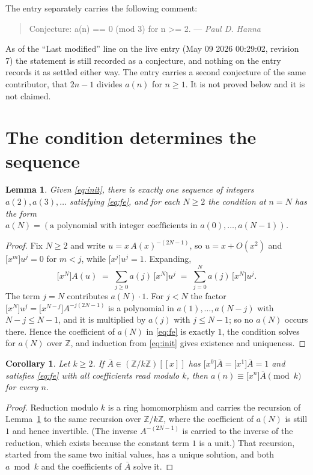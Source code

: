 \documentclass[11pt,a4paper]{article}
\theoremstyle{plain}
\newtheorem{lemma}[theorem]{Lemma}
\newtheorem{corollary}[theorem]{Corollary}
\theoremstyle{definition}
\begin{document}
The entry separately carries the following comment:
\begin{quote}\small
Conjecture: a(n) == 0 (mod 3) for n >= 2. --- \emph{Paul D. Hanna}
\end{quote}
As of the ``Last modified'' line on the live entry (May 09 2026 00:29:02, revision 7) the statement is
still recorded as a conjecture, and nothing on the entry records it as settled either way.
The entry carries a second conjecture of the same contributor, that $2n-1$ divides $a(n)$
for $n\ge1$. It is not proved below and it is not claimed.

\section{The condition determines the sequence}

\begin{lemma}\label{lem:unique}
Given \eqref{eq:init}, there is exactly one sequence of integers $a(2),a(3),\dots$
satisfying \eqref{eq:fe}, and for each $N\ge2$ the condition at $n=N$ has the form
$a(N)=(\text{a polynomial with integer coefficients in }a(0),\dots,a(N-1))$.
\end{lemma}

\begin{proof}
Fix $N\ge2$ and write $u=x\,A(x)^{-(2N-1)}$, so $u=x+O(x^{2})$ and
$\bigl[x^{m}\bigr]u^{j}=0$ for $m<j$, while $\bigl[x^{j}\bigr]u^{j}=1$. Expanding,
\[
\bigl[x^{N}\bigr]A(u)\;=\;\sum_{j\ge0}a(j)\,\bigl[x^{N}\bigr]u^{j}
\;=\;\sum_{j=0}^{N}a(j)\,\bigl[x^{N}\bigr]u^{j} .
\]
The term $j=N$ contributes $a(N)\cdot1$. For $j<N$ the factor
$\bigl[x^{N}\bigr]u^{j}=\bigl[x^{N-j}\bigr]A^{-j(2N-1)}$ is a polynomial in
$a(1),\dots,a(N-j)$ with $N-j\le N-1$, and it is multiplied by $a(j)$ with $j\le N-1$; so
no $a(N)$ occurs there. Hence the coefficient of $a(N)$ in \eqref{eq:fe} is exactly $1$,
the condition solves for $a(N)$ over $\mathbb{Z}$, and induction from \eqref{eq:init}
gives existence and uniqueness.
\end{proof}

\begin{corollary}\label{cor:mod}
Let $k\ge2$. If $\bar A\in(\mathbb{Z}/k\mathbb{Z})[[x]]$ has
$\bigl[x^{0}\bigr]\bar A=\bigl[x^{1}\bigr]\bar A=1$ and satisfies \eqref{eq:fe} with all
coefficients read modulo $k$, then $a(n)\equiv\bigl[x^{n}\bigr]\bar A\pmod k$ for every $n$.
\end{corollary}

\begin{proof}
Reduction modulo $k$ is a ring homomorphism and carries the recursion of
Lemma~\ref{lem:unique} to the same recursion over $\mathbb{Z}/k\mathbb{Z}$, where the
coefficient of $a(N)$ is still $1$ and hence invertible. (The inverse $A^{-(2N-1)}$ is
carried to the inverse of the reduction, which exists because the constant term $1$ is a
unit.) That recursion, started from the same two initial values, has a unique solution, and
both $a\bmod k$ and the coefficients of $\bar A$ solve it.
\end{proof}
\end{document}
